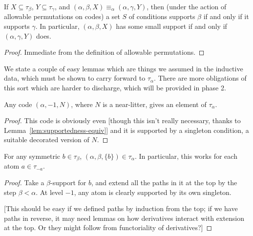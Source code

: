 \begin{lemma}
\label{lem:supportedness-equiv}
\leanok
If $X \subseteq \tau_\beta$, $Y \subseteq \tau_\gamma$, and $(\alpha,\beta,X) \equiv_\alpha (\alpha,\gamma,Y)$, then (under the action of allowable permutations on codes) a set $S$ of conditions supports $\beta$ if and only if it supports $\gamma$.  In particular,  $(\alpha,\beta,X)$ has some small support if and only if $(\alpha,\gamma,Y)$ does.
\end{lemma}

\begin{proof}
\leanok
  Immediate from the definition of allowable permutations.
\end{proof}

We state a couple of easy lemmas which are things we assumed in the inductive data, which must be shown to carry forward to $\tau_\alpha$.  There are more obligations of this sort which are harder to discharge, which will be provided in phase 2.

\begin{lemma}
\label{def:typed-near-litter}
\leanok
Any code $(\alpha,-1,N)$, where $N$ is a near-litter, gives an element of $\tau_\alpha$.
\end{lemma}

\begin{proof}
This code is obviously even [though this isn’t really necessary, thanks to Lemma~\ref{lem:supportedness-equiv}] and it is supported by a singleton condition, a suitable decorated version of $N$.
\end{proof}

\begin{lemma}
\label{def:typed-singleton}
\leanok
For any symmetric $b \in \tau_\beta$, $(\alpha,\beta,\{b\}) \in \tau_\alpha$. In particular, this works for each atom $a \in \tau_{-a}$.
\end{lemma}

\begin{proof}
Take a $\beta$-support for $b$, and extend all the paths in it at the top by the step $\beta < \alpha$.  At level $-1$, any atom is clearly supported by its own singleton.

[This should be easy if we defined paths by induction from the top; if we have paths in reverse, it may need lemmas on how derivatives interact with extension at the top.  Or they might follow from functoriality of derivatives?]
\end{proof}

